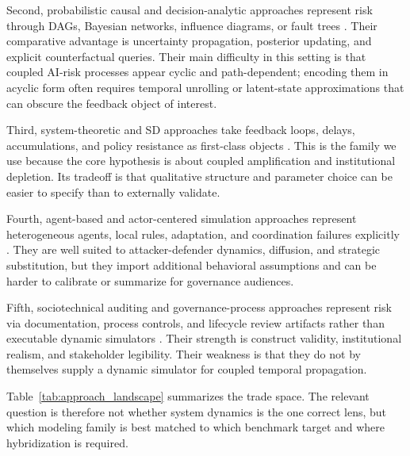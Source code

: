 \documentclass[11pt]{article}
\begin{document}
Second, probabilistic causal and decision-analytic approaches represent risk through DAGs, Bayesian networks, influence diagrams, or fault trees \citep{pearl2009,fenton2012,barrett2023}. Their comparative advantage is uncertainty propagation, posterior updating, and explicit counterfactual queries. Their main difficulty in this setting is that coupled AI-risk processes appear cyclic and path-dependent; encoding them in acyclic form often requires temporal unrolling or latent-state approximations that can obscure the feedback object of interest.

Third, system-theoretic and SD approaches take feedback loops, delays, accumulations, and policy resistance as first-class objects \citep{forrester1961,sterman2000,meadows2008,leveson2011}. This is the family we use because the core hypothesis is about coupled amplification and institutional depletion. Its tradeoff is that qualitative structure and parameter choice can be easier to specify than to externally validate.

Fourth, agent-based and actor-centered simulation approaches represent heterogeneous agents, local rules, adaptation, and coordination failures explicitly \citep{bonabeau2002}. They are well suited to attacker-defender dynamics, diffusion, and strategic substitution, but they import additional behavioral assumptions and can be harder to calibrate or summarize for governance audiences.

Fifth, sociotechnical auditing and governance-process approaches represent risk via documentation, process controls, and lifecycle review artifacts rather than executable dynamic simulators \citep{raji2020auditing,weidinger2023,mitchell2019modelcards}. Their strength is construct validity, institutional realism, and stakeholder legibility. Their weakness is that they do not by themselves supply a dynamic simulator for coupled temporal propagation.

Table~\ref{tab:approach_landscape} summarizes the trade space. The relevant question is therefore not whether system dynamics is the one correct lens, but which modeling family is best matched to which benchmark target and where hybridization is required.
\end{document}
